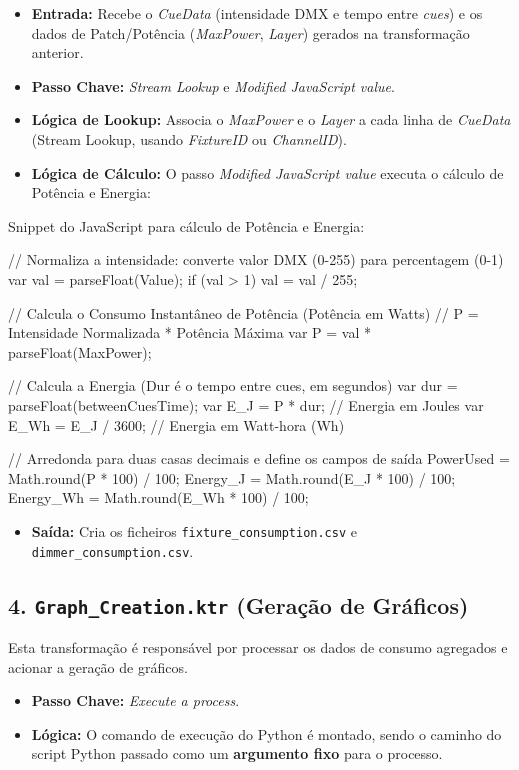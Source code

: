 \documentclass[a4paper, 12pt]{article}
\begin{document}
	\begin{itemize}
		\item \textbf{Entrada:} Recebe o \textit{CueData} (intensidade DMX e tempo entre \textit{cues}) e os dados de Patch/Potência (\textit{MaxPower}, \textit{Layer}) gerados na transformação anterior.
		\item \textbf{Passo Chave:} \textit{Stream Lookup} e \textit{Modified JavaScript value}.
		\item \textbf{Lógica de Lookup:} Associa o \textit{MaxPower} e o \textit{Layer} a cada linha de \textit{CueData} (Stream Lookup, usando \textit{FixtureID} ou \textit{ChannelID}).
		\item \textbf{Lógica de Cálculo:} O passo \textit{Modified JavaScript value} executa o cálculo de Potência e Energia:
	\end{itemize}
	
	Snippet do JavaScript para cálculo de Potência e Energia:
	\noindent
\begin{KettleCode}
// Normaliza a intensidade: converte valor DMX (0-255) para percentagem (0-1)
var val = parseFloat(Value);
if (val > 1) val = val / 255;  

// Calcula o Consumo Instantâneo de Potência (Potência em Watts)
// P = Intensidade Normalizada * Potência Máxima
var P = val * parseFloat(MaxPower);

// Calcula a Energia (Dur é o tempo entre cues, em segundos)
var dur = parseFloat(betweenCuesTime);
var E_J = P * dur; // Energia em Joules
var E_Wh = E_J / 3600; // Energia em Watt-hora (Wh)

// Arredonda para duas casas decimais e define os campos de saída
PowerUsed = Math.round(P * 100) / 100;
Energy_J  = Math.round(E_J * 100) / 100;
Energy_Wh = Math.round(E_Wh * 100) / 100;
\end{KettleCode}
	\begin{itemize}
		\item \textbf{Saída:} Cria os ficheiros \texttt{fixture\_consumption.csv} e \texttt{dimmer\_consumption.csv}.
	\end{itemize}
	
	\subsection{4. \texttt{Graph\_Creation.ktr} (Geração de Gráficos)}
	Esta transformação é responsável por processar os dados de consumo agregados e acionar a geração de gráficos.
	
	\begin{itemize}
		\item \textbf{Passo Chave:} \textit{Execute a process}.
		\item \textbf{Lógica:} O comando de execução do Python é montado, sendo o caminho do script Python passado como um \textbf{argumento fixo} para o processo.
	\end{itemize}
	
\end{document}
